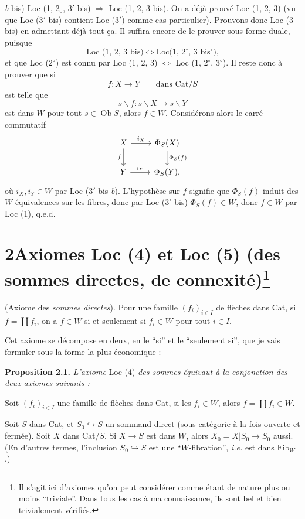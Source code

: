 \textit{b} bis) Loc (1, $2_0$, $3'$ bis) $\Longrightarrow$ Loc (1, 2, 3 bis). On a déjà prouvé Loc (1, 2, 3) (vu que Loc ($3'$ bis) contient Loc ($3'$) comme cas particulier). Prouvons donc Loc (3 bis) en admettant déjà tout ça. Il suffira encore de le prouver sous forme duale, puisque
\[
\text{Loc (1, 2, 3 bis)} \iff \text{Loc(1, $2^\circ$, 3 bis$^\circ$),}
\]
et que Loc ($2^\circ$) est connu par Loc (1, 2, 3) $\Longleftrightarrow$ Loc (1, $2^\circ$, $3^\circ$). Il reste donc à prouver que si
\[
f : X \longrightarrow Y \qquad \text{dans } \mathrm{Cat}/S
\]
est telle que
\[
s\backslash f : s\backslash X \longrightarrow s\backslash Y
\]
est dans $W$ pour tout $s \in \operatorname{Ob} S$, alors $f \in W$. Considérons alors le carré commutatif
\[
\begin{tikzcd}
X \arrow[r, "i_X"] \arrow[d, "f"'] & \Phi_S(X) \arrow[d, "\Phi_S(f)"] \\
Y \arrow[r, "i_Y"] & \Phi_S(Y),
\end{tikzcd}
\]
où $i_X, i_Y \in W$ par Loc ($3'$ bis \textit{b}). L'hypothèse sur $f$ signifie que $\Phi_S(f)$ induit des $W$-équivalences sur les fibres, donc par Loc ($3'$ bis) $\Phi_S(f) \in W$, donc $f \in W$ par Loc (1), q.e.d.

\section*{2\quad Axiomes Loc (4) et Loc (5) (des sommes directes, de connexité)\protect\footnote{Il s'agit ici d'axiomes qu'on peut considérer comme étant de nature plus ou moins “triviale”. Dans tous les cas à ma connaissance, ils sont bel et bien trivialement vérifiés.}}

\begin{description}[leftmargin=7em, labelwidth=6em]
\item[Loc (4)] (Axiome des \textit{sommes directes}). Pour une famille $(f_i)_{i\in I}$ de flèches dans Cat, si $f = \coprod f_i$, on a $f \in W$ si et seulement si $f_i \in W$ pour tout $i \in I$.
\end{description}

Cet axiome se décompose en deux, en le “si” et le “seulement si”, que je vais formuler sous la forme la plus économique :

\textbf{Proposition 2.1.} \textit{L'axiome} Loc (4) \textit{des sommes équivaut à la conjonction des deux axiomes suivants :}

\begin{description}[leftmargin=7em, labelwidth=6em]
\item[Loc (4 a)] Soit $(f_i)_{i\in I}$ une famille de flèches dans Cat, si les $f_i \in W$, alors $f = \coprod f_i \in W$.
\item[Loc (4 b)] Soit $S$ dans Cat, et $S_0 \hookrightarrow S$ un sommand direct (sous-catégorie à la fois ouverte et fermée). Soit $X$ dans Cat$/S$. Si $X \longrightarrow S$ est dans $W$, alors $X_0 = X|S_0 \longrightarrow S_0$ aussi. (En d'autres termes, l'inclusion $S_0 \hookrightarrow S$ est une “$W$-fibration”, \textit{i.e.} est dans $\mathrm{Fib}_W$.)
\end{description}

